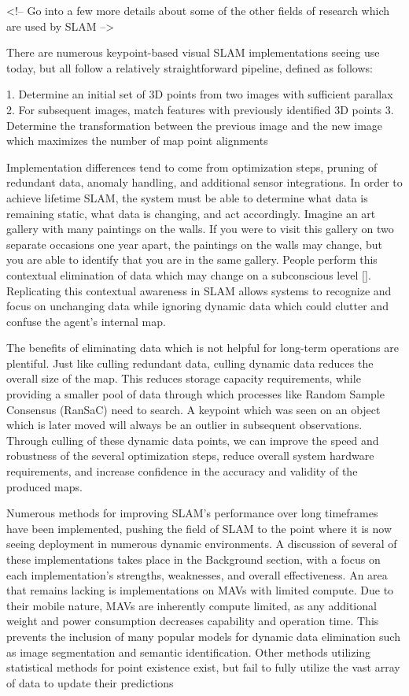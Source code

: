 <!-- Go into a few more details about some of the other fields of research which are used by SLAM -->

There are numerous keypoint-based visual SLAM implementations seeing use today, but all follow a relatively straightforward pipeline, defined as follows:

1. Determine an initial set of 3D points from two images with sufficient parallax
2. For subsequent images, match features with previously identified 3D points
3. Determine the transformation between the previous image and the new image which maximizes the number of map point alignments

Implementation differences tend to come from optimization steps, pruning of redundant data, anomaly handling, and additional sensor integrations. In order to achieve lifetime SLAM, the system must be able to determine what data is remaining static, what data is changing, and act accordingly. Imagine an art gallery with many paintings on the walls. If you were to visit this gallery on two separate occasions one year apart, the paintings on the walls may change, but you are able to identify that you are in the same gallery. People perform this contextual elimination of data which may change on a subconscious level []. Replicating this contextual awareness in SLAM allows systems to recognize and focus on unchanging data while ignoring dynamic data which could clutter and confuse the agent's internal map.

The benefits of eliminating data which is not helpful for long-term operations are plentiful. Just like culling redundant data, culling dynamic data reduces the overall size of the map. This reduces storage capacity requirements, while providing a smaller pool of data through which processes like Random Sample Consensus (RanSaC) need to search. A keypoint which was seen on an object which is later moved will always be an outlier in subsequent observations. Through culling of these dynamic data points, we can improve the speed and robustness of the several optimization steps, reduce overall system hardware requirements, and increase confidence in the accuracy and validity of the produced maps.

Numerous methods for improving SLAM's performance over long timeframes have been implemented, pushing the field of SLAM to the point where it is now seeing deployment in numerous dynamic environments. A discussion of several of these implementations takes place in the Background section, with a focus on each implementation's strengths, weaknesses, and overall effectiveness. An area that remains lacking is implementations on MAVs with limited compute. Due to their mobile nature, MAVs are inherently compute limited, as any additional weight and power consumption decreases capability and operation time. This prevents the inclusion of many popular models for dynamic data elimination such as image segmentation and semantic identification. Other methods utilizing statistical methods for point existence exist, but fail to fully utilize the vast array of data to update their predictions